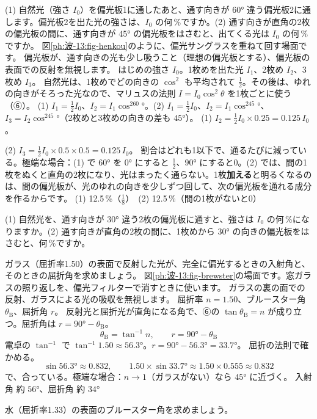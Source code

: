\begin{phreidai}[偏光板を重ねる]
\label{ph:波-13:ex10}(1) 自然光（強さ $I_0$）を偏光板1に通したあと、通す向きが $60°$ 違う偏光板2に通します。偏光板2を出た光の強さは、$I_0$ の何\,\%ですか。(2) 通す向きが直角の2枚の偏光板の間に、通す向きが $45°$ の偏光板をはさむと、出てくる光は $I_0$ の何\,\%ですか。
\phbamen
図\ref{ph:波-13:fig-henkou}のように、偏光サングラスを重ねて回す場面です。
\phmushi
偏光板が、通す向きの光も少し吸うこと（理想の偏光板とする）、偏光板の表面での反射を無視します。
\phzu
はじめの強さ $I_0$。1枚めを出た光 $I_1$、2枚め $I_2$、3枚め $I_3$。
\phriyu
自然光は、1枚めでどの向きの $\cos^2$ も平均されて $\tfrac12$。その後は、ゆれの向きがそろった光なので、マリュスの法則 $I=I_0\cos^2\theta$ を1枚ごとに使う（⑥）。
\phtateru
(1) $I_1=\tfrac12I_0$、$I_2=I_1\cos^260°$。(2) $I_1=\tfrac12I_0$、$I_2=I_1\cos^245°$、$I_3=I_2\cos^245°$（2枚めと3枚めの向きの差も $45°$）。
\phtoku
(1) $I_2=\tfrac12I_0\times0.25=0.125\,I_0$。\par
(2) $I_3=\tfrac12I_0\times0.5\times0.5=0.125\,I_0$。
\phtashikame
割合はどれも1以下で、通るたびに減っている。極端な場合：(1) で $60°$ を $0°$ にすると $\tfrac12$、$90°$ にすると0。(2) では、間の1枚をぬくと直角の2枚になり、光はまったく通らない。1枚\textbf{加える}と明るくなるのは、間の偏光板が、光のゆれの向きを少しずつ回して、次の偏光板を通れる成分を作るからです。
\kotae (1) 12.5\,\%（$\tfrac18$）　(2) 12.5\,\%（間の1枚がないと0）
\end{phreidai}
\begin{jibun}
(1) 自然光を、通す向きが $30°$ 違う2枚の偏光板に通すと、強さは $I_0$ の何\,\%になりますか。(2) 通す向きが直角の2枚の間に、1枚めから $30°$ の向きの偏光板をはさむと、何\,\%ですか。
\end{jibun}

\begin{phreidai}[窓ガラスのブルースター角]
\label{ph:波-13:ex11}ガラス（屈折率1.50）の表面で反射した光が、完全に偏光するときの入射角と、そのときの屈折角を求めましょう。
\phbamen
図\ref{ph:波-13:fig-brewster}の場面です。窓ガラスの照り返しを、偏光フィルターで消すときに使います。
\phmushi
ガラスの裏の面での反射、ガラスによる光の吸収を無視します。
\phzu
屈折率 $n=1.50$、ブルースター角 $\theta_{\mathrm B}$、屈折角 $r$。
\phriyu
反射光と屈折光が直角になる角で、⑥の $\tan\theta_{\mathrm B}=n$ が成り立つ。屈折角は $r=90°-\theta_{\mathrm B}$。
\phtateru
\[ \theta_{\mathrm B}=\tan^{-1}n,\qquad r=90°-\theta_{\mathrm B} \]
\phtoku
電卓の $\tan^{-1}$ で $\tan^{-1}1.50\approx56.3°$。$r=90°-56.3°=33.7°$。
\phtashikame
屈折の法則で確かめる。
\[ \sin56.3°\approx0.832,\qquad 1.50\times\sin33.7°\approx1.50\times0.555\approx0.832 \]
で、合っている。極端な場合：$n\to1$（ガラスがない）なら $45°$ に近づく。
\kotae 入射角 約 $56°$、屈折角 約 $34°$
\end{phreidai}
\begin{jibun}
水（屈折率1.33）の表面のブルースター角を求めましょう。
\end{jibun}

